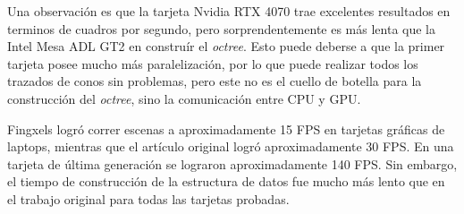 Una observación es que la tarjeta Nvidia RTX 4070 trae excelentes resultados en terminos de cuadros por segundo, pero sorprendentemente es más lenta que la Intel Mesa ADL GT2 en construír el \textit{octree}.
Esto puede deberse a que la primer tarjeta posee mucho más paralelización, por lo que puede realizar todos los trazados de conos sin problemas, pero este no es el cuello de botella para la construcción del \textit{octree}, sino la comunicación entre CPU y GPU.

Fingxels logró correr escenas a aproximadamente 15 FPS en tarjetas gráficas de laptops, mientras que el artículo original logró aproximadamente 30 FPS.
En una tarjeta de última generación se lograron aproximadamente 140 FPS.
Sin embargo, el tiempo de construcción de la estructura de datos fue mucho más lento que en el trabajo original para todas las tarjetas probadas.
